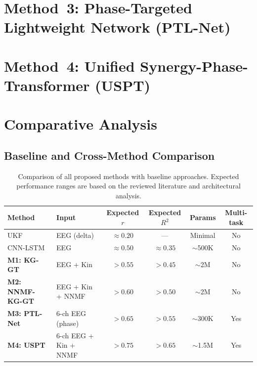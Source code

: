 \documentclass[12pt, a4paper]{article}
\begin{document}
	
	
	\newpage
	
	\section{Method~3: Phase-Targeted Lightweight Network (PTL-Net)}
	\label{sec:method3}
	
	
	
	\newpage
	
	\section{Method~4: Unified Synergy-Phase-Transformer (USPT)}
	\label{sec:method4}
	
	
	
	\newpage
	
	\section{Comparative Analysis}
	
	\subsection{Baseline and Cross-Method Comparison}
	
	\begin{table}[H]
		\centering
		\caption{Comparison of all proposed methods with baseline approaches.
			Expected performance ranges are based on the reviewed literature and
			architectural analysis.}
		\label{tab:comparison}
		\renewcommand{\arraystretch}{1.3}
		\begin{tabular}{llcccc}
			\toprule
			\textbf{Method} & \textbf{Input} &
			\textbf{Expected $r$} & \textbf{Expected $R^2$} &
			\textbf{Params} & \textbf{Multi-task} \\
			\midrule
			UKF~\cite{sburlea2021} & EEG (delta) &
			$\approx 0.20$ & --- & Minimal & No \\
			CNN-LSTM~\cite{jain2025} & EEG &
			$\approx 0.50$ & $\approx 0.35$ & $\sim$500K & No \\
			\midrule
			\textbf{M1: KG-GT} & EEG + Kin &
			$>0.55$ & $>0.45$ & $\sim$2M & No \\
			\textbf{M2: NNMF-KG-GT} & EEG + Kin + NNMF &
			$>0.60$ & $>0.50$ & $\sim$2M & No \\
			\textbf{M3: PTL-Net} & 6-ch EEG (phase) &
			$>0.65$ & $>0.55$ & $\sim$300K & Yes \\
			\textbf{M4: USPT} & 6-ch EEG + Kin + NNMF &
			$>0.75$ & $>0.65$ & $\sim$1.5M & Yes \\
			\bottomrule
		\end{tabular}
	\end{table}
	
\end{document}
